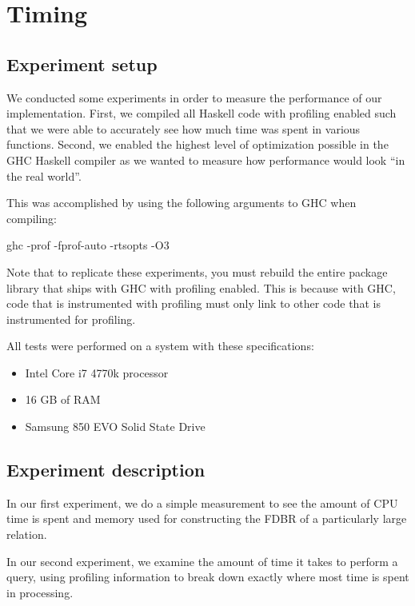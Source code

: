 \documentclass[../main.tex]{subfiles}
\begin{document}
\chapter{Timing}
\label{chapter:timing}

\section{Experiment setup}

We conducted some experiments in order to measure the performance of our implementation.
First, we compiled all Haskell code with profiling enabled such that we were able to accurately see how much time was spent in various functions.
Second, we enabled the highest level of optimization possible in the GHC Haskell compiler as we wanted to measure how performance would look
``in the real world''.

This was accomplished by using the following arguments to GHC when compiling:

\begin{code}
	ghc -prof -fprof-auto -rtsopts -O3
\end{code}

Note that to replicate these experiments, you must rebuild the entire package library that ships with GHC with profiling enabled.
This is because with GHC, code that is instrumented with profiling must only link to other code that is instrumented for profiling.

All tests were performed on a system with these specifications:

\begin{itemize}
	\item Intel Core i7 4770k processor
	\item 16 GB of RAM
	\item Samsung 850 EVO Solid State Drive
\end{itemize}


\section{Experiment description}

In our first experiment, we do a simple measurement to see the amount of CPU time is spent and memory used for constructing the FDBR of
a particularly large relation.

In our second experiment, we examine the amount of time it takes to perform a query, using profiling information to break down
exactly where most time is spent in processing.
\end{document}
